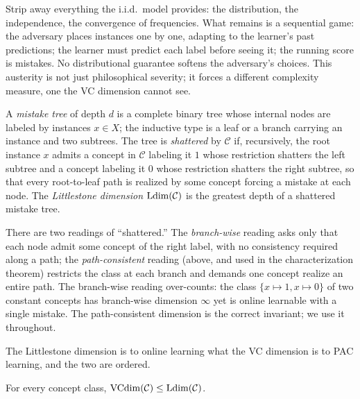 Strip away everything the i.i.d.\ model provides: the distribution, the independence, the convergence of frequencies. What remains is a sequential game: the adversary places instances one by one, adapting to the learner's past predictions; the learner must predict each label before seeing it; the running score is mistakes. No distributional guarantee softens the adversary's choices. This austerity is not just philosophical severity; it forces a different complexity measure, one the VC dimension cannot see.

\begin{defn}
\label{def:mistake-tree-data}
A \emph{mistake tree} of depth $d$ is a complete binary tree whose internal nodes are labeled by instances $x \in X$; the inductive type is a leaf or a branch carrying an instance and two subtrees. The tree is \emph{shattered} by $\mathcal{C}$ if, recursively, the root instance $x$ admits a concept in $\mathcal{C}$ labeling it $1$ whose restriction shatters the left subtree and a concept labeling it $0$ whose restriction shatters the right subtree, so that every root-to-leaf path is realized by some concept forcing a mistake at each node. The \emph{Littlestone dimension} $\mathrm{Ldim}(\mathcal{C})$ is the greatest depth of a shattered mistake tree.
\end{defn}

\begin{warning}
\label{rmk:branchwise}
There are two readings of ``shattered.'' The \emph{branch-wise} reading asks only that each node admit some concept of the right label, with no consistency required along a path; the \emph{path-consistent} reading (above, and used in the characterization theorem) restricts the class at each branch and demands one concept realize an entire path. The branch-wise reading over-counts: the class $\{x \mapsto 1, x \mapsto 0\}$ of two constant concepts has branch-wise dimension $\infty$ yet is online learnable with a single mistake. The path-consistent dimension is the correct invariant; we use it throughout.
\end{warning}

The Littlestone dimension is to online learning what the VC dimension is to PAC learning, and the two are ordered.

\begin{prop}
\label{prop:vc-le-ldim}
For every concept class, $\mathrm{VCdim}(\mathcal{C}) \leq \mathrm{Ldim}(\mathcal{C})$.
\end{prop}

